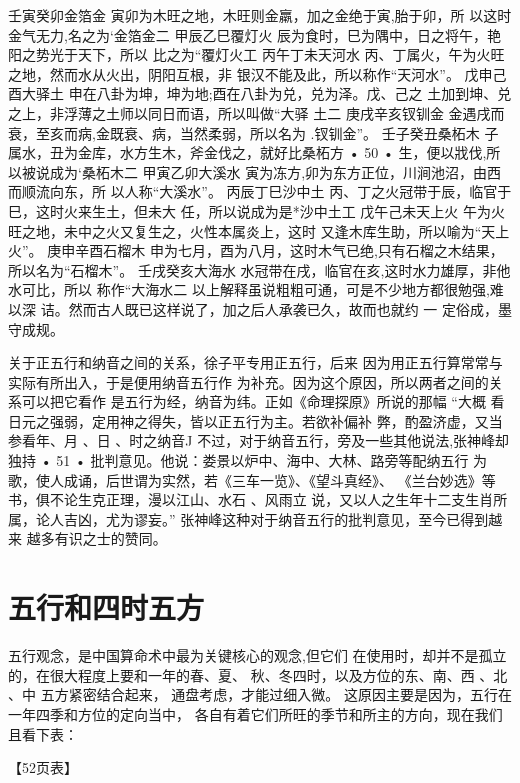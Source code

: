 壬寅癸卯金箔金
寅卯为木旺之地，木旺则金羸，加之金绝于寅,胎于卯，所
以这时金气无力,名之为‘金箔金二
甲辰乙巳覆灯火
辰为食时，巳为隅中，日之将午，艳阳之势光于天下，所以
比之为“覆灯火工
丙午丁未天河水
丙、丁属火，午为火旺之地，然而水从火出，阴阳互根，非
银汉不能及此，所以称作“天河水”。
戊申己酉大驿土
申在八卦为坤，坤为地;酉在八卦为兑，兑为泽。戊、己之
土加到坤、兑之上，非浮薄之土师以同日而语，所以叫做“大驿
土二
庚戌辛亥钗钏金
金遇戌而衰，至亥而病,金既衰、病，当然柔弱，所以名为
.钗钏金”。
壬子癸丑桑柘木
子属水，丑为金库，水方生木，斧金伐之，就好比桑柘方
• 50 •
生，便以戕伐,所以被说成为‘桑柘木二
甲寅乙卯大溪水
寅为冻方,卯为东方正位，川涧池沼，由西而顺流向东，所
以人称“大溪水”。
丙辰丁巳沙中土
丙、丁之火冠带于辰，临官于巳，这时火来生土，但未大
任，所以说成为是*沙中土工
戊午己未天上火
午为火旺之地，未中之火又复生之，火性本属炎上，这时
又逢木库生助，所以喻为“天上火”。
庚申辛酉石榴木
申为七月，酉为八月，这时木气已绝,只有石榴之木结果，
所以名为“石榴木”。
壬戌癸亥大海水
水冠带在戌，临官在亥,这时水力雄厚，非他水可比，所以
称作“大海水二
以上解释虽说粗粗可通，可是不少地方都很勉强,难以深
诘。然而古人既已这样说了，加之后人承袭已久，故而也就约 一
定俗成，墨守成规。

关于正五行和纳音之间的关系，徐子平专用正五行，后来
因为用正五行算常常与实际有所出入，于是便用纳音五行作
为补充。因为这个原因，所以两者之间的关系可以把它看作
是五行为经，纳音为纬。正如《命理探原》所说的那幅 “大概
看日元之强弱，定用神之得失，皆以正五行为主。若欲补偏补
弊，酌盈济虚，又当参看年、月 、日 、时之纳音J
不过，对于纳音五行，旁及一些其他说法,张神峰却独持
• 51 •
批判意见。他说：娄景以炉中、海中、大林、路旁等配纳五行
为歌，使人成诵，后世谓为实然，若《三车一览》、《望斗真经》、
《兰台妙选》等书，俱不论生克正理，漫以江山、水石 、风雨立
说，又以人之生年十二支生肖所属，论人吉凶，尤为谬妄。”
张神峰这种对于纳音五行的批判意见，至今已得到越来
越多有识之士的赞同。


\section{五行和四时五方}
五行观念，是中国算命术中最为关键核心的观念,但它们
在使用时，却并不是孤立的，在很大程度上要和一年的春、夏、
秋、冬四时，以及方位的东、南、西 、北 、中 五方紧密结合起来，
通盘考虑，才能过细入微。
这原因主要是因为，五行在一年四季和方位的定向当中，
各自有着它们所旺的季节和所主的方向，现在我们且看下表：

【52页表】

